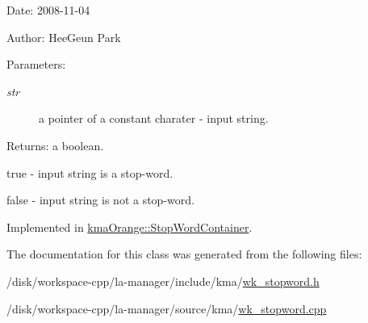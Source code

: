 \begin{Desc}
\item[Date:]2008-11-04 \end{Desc}
\begin{Desc}
\item[Author:]HeeGeun Park \end{Desc}
\begin{Desc}
\item[Parameters:]
\begin{description}
\item[{\em str}]a pointer of a constant charater - input string. \end{description}
\end{Desc}
\begin{Desc}
\item[Returns:]a boolean.\par
 true - input string is a stop-word.\par
 false - input string is not a stop-word. \end{Desc}


Implemented in \hyperlink{classkmaOrange_1_1StopWordContainer_a2bd1c44212a17f7ae12de9287860ad1}{kmaOrange::StopWordContainer}.

The documentation for this class was generated from the following files:\begin{CompactItemize}
\item 
/disk/workspace-cpp/la-manager/include/kma/\hyperlink{wk__stopword_8h}{wk\_\-stopword.h}\item 
/disk/workspace-cpp/la-manager/source/kma/\hyperlink{wk__stopword_8cpp}{wk\_\-stopword.cpp}\end{CompactItemize}
